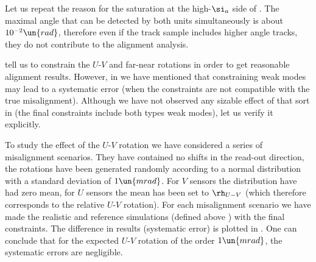 Let us repeat the reason for the saturation at the high-$\si_a$ side of . The maximal angle that can be detected by both units simultaneously is about $10^{-2}\un{rad}$, therefore even if the track sample includes higher angle tracks, they do not contribute to the alignment analysis.


 tell us to constrain the $U$-$V$ and far-near rotations in order to get reasonable alignment results. However, in  we have mentioned that constraining weak modes may lead to a systematic error (when the constraints are not compatible with the true misalignment). Although we have not observed any sizable effect of that sort in  (the final constraints include both types weak modes), let us verify it explicitly.

To study the effect of the $U$-$V$ rotation we have considered a series of misalignment scenarios. They have contained no shifts in the read-out direction, the rotations have been generated randomly according to a normal distribution with a standard deviation of $1\un{mrad}$. For $V$ sensors the distribution have had zero mean, for $U$ sensors the mean has been set to $\rh_{U-V}$ (which therefore corresponds to the relative $U$-$V$ rotation). For each misalignment scenario we have made the realistic and reference simulations (defined above ) with the final constraints. The difference in results (systematic error) is plotted in . One can conclude that for the expected $U$-$V$ rotation of the order $1\un{mrad}$, the systematic errors are negligible.



